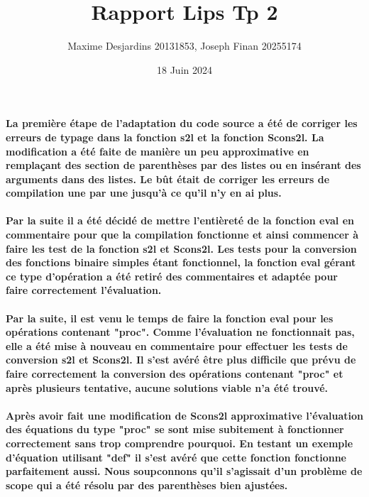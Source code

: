 \documentclass{article}
\title{Rapport Lips Tp 2}
\author{Maxime Desjardins 20131853, Joseph Finan 20255174}
\date{18 Juin 2024}
\begin{document}
\maketitle

\paragraph{La première étape de l'adaptation du code source a été de corriger les erreurs de typage dans la fonction s2l et la fonction Scons2l. La modification a été faite de manière un peu approximative en remplaçant des section de parenthèses par des listes ou en insérant des arguments dans des listes. Le bût était de corriger les erreurs de compilation une par une jusqu'à ce qu'il n'y en ai plus.}

\paragraph{Par la suite il a été décidé de mettre l'entièreté de la fonction eval en commentaire pour que la compilation fonctionne et ainsi commencer à faire les test de la fonction s2l et Scons2l. Les tests pour la conversion des fonctions binaire simples étant fonctionnel, la fonction eval gérant ce type d'opération a été retiré des commentaires et adaptée pour faire correctement l'évaluation.}

\paragraph{Par la suite, il est venu le temps de faire la fonction eval pour les opérations contenant "proc". Comme l'évaluation ne fonctionnait pas, elle a été mise à nouveau en commentaire pour effectuer les tests de conversion s2l et Scons2l. Il s'est avéré être plus difficile que prévu de faire correctement la conversion des opérations contenant "proc" et après plusieurs tentative, aucune solutions viable n'a été trouvé.}

\paragraph{Après avoir fait une modification de Scons2l approximative l'évaluation des équations du type "proc" se sont mise subitement à fonctionner correctement sans trop comprendre pourquoi. En testant un exemple d'équation utilisant "def" il s'est avéré que cette fonction fonctionne parfaitement aussi. Nous soupconnons qu'il s'agissait d'un problème de scope qui a été résolu par des parenthèses bien ajustées.}
\end{document}
